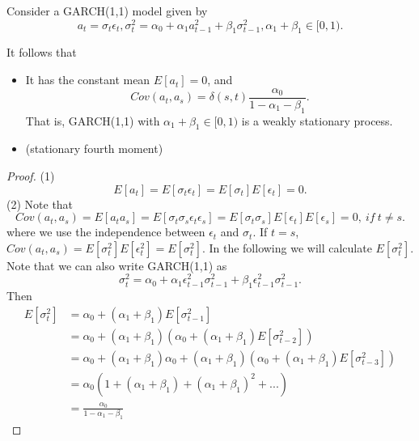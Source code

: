 \begin{lemma}	\label{ch:time-series-analysis:th:weakStationaryGARCH(1)}
	Consider a GARCH(1,1) model given by
	$$a_t = \sigma_t \epsilon_t, \sigma_t^2 = \alpha_0 + \alpha_1a_{t-1}^2 + \beta_1 \sigma_{t-1}^2, \alpha_1 + \beta_1 \in [0,1).$$
	
	It follows that
	\begin{itemize}
		\item It has the constant mean $E[a_t] = 0$, and $$Cov(a_t,a_s) = \delta(s,t) \frac{\alpha_0}{1 - \alpha_1 - \beta_1}.$$
		That is, GARCH(1,1) with $\alpha_1+\beta_1\in [0,1)$ is a weakly stationary process. 
		\item (stationary fourth moment) 
	\end{itemize}
\end{lemma}
\begin{proof}
	(1) $$E[a_t] = E[\sigma_t\epsilon_t]=E[\sigma_t]E[\epsilon_t] = 0.$$	
	(2) 
	Note that 
	$$Cov(a_t,a_s) = E[a_ta_{s}] = E[\sigma_t\sigma_{s}\epsilon_t\epsilon_{s}] =E[\sigma_t\sigma_{s}]E[\epsilon_t]E[\epsilon_{s}] = 0, ~if~ t\neq s.$$
	where we use the independence between $\epsilon_t$ and $\sigma_t$.
	If $t=s$, $Cov(a_t,a_s) = E[\sigma_t^2]E[\epsilon_t^2] = E[\sigma_t^2]$.
	In the following we will calculate $E[\sigma_t^2]$.
	Note that we can also write GARCH(1,1) as $$\sigma_t^2 = \alpha_0 + \alpha_1\epsilon_{t-1}^2 \sigma_{t-1}^2+\beta_1\epsilon_{t-1}^2 \sigma_{t-1}^2.$$
	Then
	\begin{align*}
	E[\sigma_t^2] &= \alpha_0 + (\alpha_1 + \beta_1) E[\sigma_{t-1}^2] \\
	&= \alpha_0 + (\alpha_1+\beta_1)(\alpha_0 + (\alpha_1+\beta_1) E[\sigma_{t-2}^2]) \\
	&= \alpha_0 + (\alpha_1+\beta_1)\alpha_0 + (\alpha_1+\beta_1)(\alpha_0 +  (\alpha_1+\beta_1)E[\sigma_{t-3}^2]) \\
	&= \alpha_0(1 + (\alpha_1+\beta_1) + (\alpha_1+\beta_1)^2 + ...)\\
	&= \frac{\alpha_0}{1 - \alpha_1 - \beta_1}
	\end{align*}
	
	
\end{proof}


